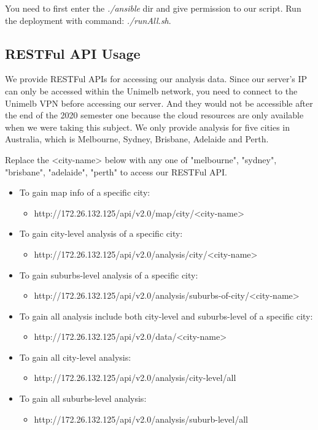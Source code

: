 \documentclass{article}
\begin{document}
You need to first enter the \textit{./ansible} dir and give permission to our script. Run the deployment with command: \textit{./runAll.sh}.

\subsection{RESTFul API Usage}
We provide RESTFul APIs for accessing our analysis data. Since our server's IP can only be accessed within the Unimelb network, you need to connect to the Unimelb VPN before accessing our server. And they would not be accessible after the end of the 2020 semester one because the cloud resources are only available when we were taking this subject. We only provide analysis for five cities in Australia, which is Melbourne, Sydney, Brisbane, Adelaide and Perth.

Replace the <city-name> below with any one of "melbourne", "sydney", "brisbane", "adelaide", "perth" to access our RESTFul API.
\begin{itemize}
	\item To gain map info of a specific city:
	\begin{itemize}
		\item http://172.26.132.125/api/v2.0/map/city/<city-name>
	\end{itemize}

	\item To gain city-level analysis of a specific city:
	\begin{itemize}
		\item http://172.26.132.125/api/v2.0/analysis/city/<city-name>
	\end{itemize}

	\item To gain suburbs-level analysis of a specific city:
	\begin{itemize}
		\item http://172.26.132.125/api/v2.0/analysis/suburbs-of-city/<city-name>
	\end{itemize}

	\item To gain all analysis include both city-level and suburbs-level of a specific city:
	\begin{itemize}
		\item http://172.26.132.125/api/v2.0/data/<city-name>
	\end{itemize}

	\item To gain all city-level analysis:
	\begin{itemize}
		\item http://172.26.132.125/api/v2.0/analysis/city-level/all
	\end{itemize}

	\item To gain all suburbs-level analysis:
	\begin{itemize}
		\item http://172.26.132.125/api/v2.0/analysis/suburb-level/all
	\end{itemize}
\end{itemize}
\end{document}
